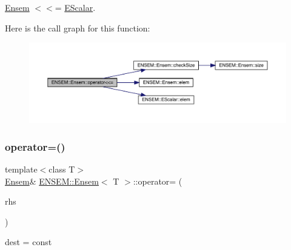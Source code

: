 \mbox{\hyperlink{classENSEM_1_1Ensem}{Ensem}} $<$$<$= \mbox{\hyperlink{classENSEM_1_1EScalar}{E\+Scalar}}. 

Here is the call graph for this function\+:
\nopagebreak
\begin{figure}[H]
\begin{center}
\leavevmode
\includegraphics[width=350pt]{d7/d3e/classENSEM_1_1Ensem_a9aecabccdc31d9b43db877a82879f702_cgraph}
\end{center}
\end{figure}
\mbox{\label{classENSEM_1_1Ensem_a1331b77ba6b10ddefa983e39976b4db6}} 
\subsubsection{\texorpdfstring{operator=()}{operator=()}\hspace{0.1cm}{\footnotesize\ttfamily [1/10]}}
{\footnotesize\ttfamily template$<$class T$>$ \\
\mbox{\hyperlink{classENSEM_1_1Ensem}{Ensem}}\& \mbox{\hyperlink{classENSEM_1_1Ensem}{E\+N\+S\+E\+M\+::\+Ensem}}$<$ T $>$\+::operator= (\begin{DoxyParamCaption}\item[{const typename \mbox{\hyperlink{structENSEM_1_1WordType}{Word\+Type}}$<$ T $>$\+::Type\+\_\+t \&}]{rhs }\end{DoxyParamCaption})\hspace{0.3cm}{\ttfamily [inline]}}



dest = const 


